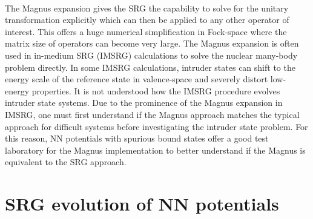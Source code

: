 \documentclass[preprintnumbers,floatfix,aps,prc,preprint,nofootinbib]{revtex4-1}
\begin{document}
\\
The Magnus expansion gives the SRG the capability to solve for the unitary transformation explicitly which can then be applied to any other operator of interest. This offers a huge numerical simplification in Fock-space where the matrix size of operators can become very large. The Magnus expansion is often used in in-medium SRG (IMSRG) calculations to solve the nuclear many-body problem directly. In some IMSRG calculations, intruder states can shift to the energy scale of the reference state in valence-space and severely distort low-energy properties. It is not understood how the IMSRG procedure evolves intruder state systems. Due to the prominence of the Magnus expansion in IMSRG, one must first understand if the Magnus approach matches the typical approach for difficult systems before investigating the intruder state problem. For this reason, NN potentials with spurious bound states offer a good test laboratory for the Magnus implementation to better understand if the Magnus is equivalent to the SRG approach.
\\



\section{SRG evolution of NN potentials}
\label{sec:srg_evolution_nn_potentials}
\end{document}
